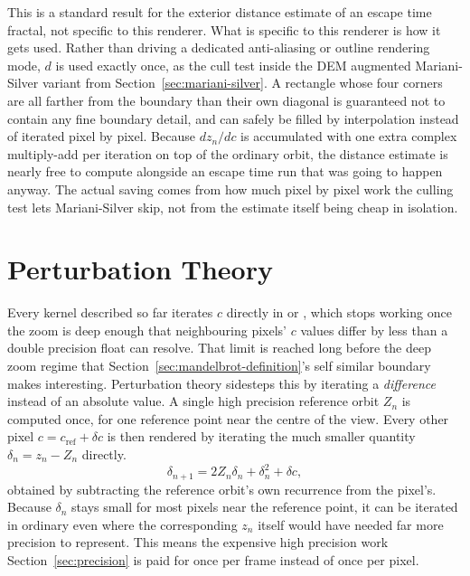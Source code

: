 \documentclass{ftndiplomski}
\begin{document}
This is a standard result for the exterior distance estimate of an escape time fractal, not
specific to this renderer. What is specific to this renderer is how it gets used. Rather than
driving a dedicated anti-aliasing or outline rendering mode, $d$ is used exactly once, as the cull
test inside the DEM augmented Mariani-Silver variant from Section~\ref{sec:mariani-silver}. A
rectangle whose four corners are all farther from the boundary than their own diagonal is
guaranteed not to contain any fine boundary detail, and can safely be filled by interpolation
instead of iterated pixel by pixel. Because $dz_n/dc$ is accumulated with one extra complex
multiply-add per iteration on top of the ordinary orbit, the distance estimate is nearly free to
compute alongside an escape time run that was going to happen anyway. The actual saving comes from
how much pixel by pixel work the culling test lets Mariani-Silver skip, not from the estimate
itself being cheap in isolation.

\section{Perturbation Theory}
\label{sec:perturbation}

Every kernel described so far iterates $c$ directly in  or , which stops working
once the zoom is deep enough that neighbouring pixels' $c$ values differ by less than a double
precision float can resolve. That limit is reached long before the deep zoom regime that
Section~\ref{sec:mandelbrot-definition}'s self similar boundary makes interesting. Perturbation
theory \cite{martin2013superfractalthing} sidesteps this by iterating a \emph{difference} instead
of an absolute value. A single high precision reference orbit $Z_n$ is computed once, for one
reference point near the centre of the view. Every other pixel $c = c_{\mathrm{ref}} + \delta c$
is then rendered by iterating the much smaller quantity $\delta_n = z_n - Z_n$ directly.
\begin{equation}
  \label{eq:perturbation}
  \delta_{n+1} = 2 Z_n \delta_n + \delta_n^2 + \delta c ,
\end{equation}
obtained by subtracting the reference orbit's own recurrence from the pixel's. Because $\delta_n$
stays small for most pixels near the reference point, it can be iterated in ordinary 
even where the corresponding $z_n$ itself would have needed far more precision to represent. This
means the expensive high precision work Section~\ref{sec:precision} is paid for once per frame
instead of once per pixel.
\end{document}
